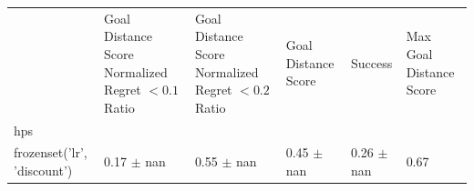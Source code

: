 \begin{tabular}{llllll}
\toprule
 & Goal Distance Score Normalized Regret $< 0.1$ Ratio & Goal Distance Score Normalized Regret $< 0.2$ Ratio & Goal Distance Score & Success & Max Goal Distance Score \\
hps &  &  &  &  &  \\
\midrule
frozenset({'lr', 'discount'}) & 0.17 $\pm$ nan & 0.55 $\pm$ nan & 0.45 $\pm$ nan & 0.26 $\pm$ nan & 0.67 \\
\bottomrule
\end{tabular}
